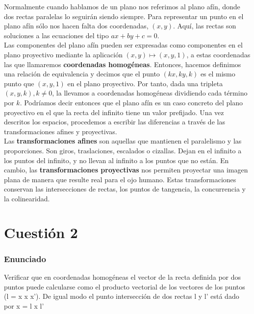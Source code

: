 Normalmente cuando hablamos de un plano nos referimos al plano afín, donde dos rectas paralelas lo seguirán siendo siempre. Para representar un punto en el plano afín sólo nos hacen falta dos coordenadas, $(x,y)$. Aquí, las rectas son soluciones a las ecuaciones del tipo $ax+by+c=0$.\\
Las componentes del plano afín pueden ser expresadas como componentes en el plano proyectivo mediante la aplicación $(x,y) \mapsto (x,y,1)$, a estas coordenadas las que llamaremos \textbf{coordenadas homogéneas}. Entonces, hacemos definimos una relación de equivalencia y decimos que el punto $(kx,ky,k)$ es el mismo punto que $(x,y,1)$ en el plano proyectivo. Por tanto, dada una tripleta $(x,y,k), k\neq0$, la llevamos a coordenadas homogéneas dividiendo cada término por $k$. Podríamos decir entonces que el plano afín es un caso concreto del plano proyectivo en el que la recta del infinito tiene un valor prefijado. Una vez descritos los espacios, procedemos a escribir las diferencias a través de las transformaciones afines y proyectivas.\\
Las \textbf{transformaciones afines} son aquellas que mantienen el paralelismo y las proporciones. Son giros, traslaciones, escalados o cizallas. Dejan en el infinito a los puntos del infinito, y no llevan al infinito a los puntos que no están. 
En cambio, las \textbf{transformaciones proyectivas} nos permiten proyectar una imagen plana de manera que resulte real para el ojo humano. Estas transformaciones conservan las intersecciones de rectas, los puntos de tangencia, la concurrencia y la colinearidad.




\section{Cuestión 2}

\subsubsection{Enunciado}

Verificar que en coordenadas homogéneas el vector de la recta definida por dos puntos puede calcularse como el producto vectorial de los vectores de los puntos (l = x \textsf{x} x'). De igual modo el punto intersección de dos rectas l y l' está dado por x = l \textsf{x} l'

